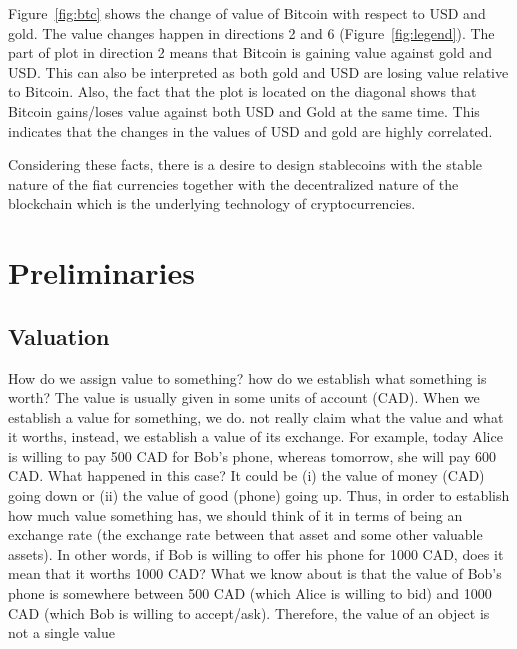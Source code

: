 Figure~\ref{fig:btc} shows the change of value of Bitcoin with respect to USD and gold. The value changes happen in directions 2 and 6 (Figure~\ref{fig:legend}). The part of plot in direction 2 means that Bitcoin is gaining value against gold and USD. This can also be interpreted as both gold and USD are losing value relative to Bitcoin. %
Also, the fact that the plot is located on the diagonal shows that Bitcoin gains/loses value against both USD and Gold at the same time. This indicates that the changes in the values of USD and gold are highly correlated.

Considering these facts, there is a desire to design stablecoins with the stable nature of the fiat currencies together with the decentralized nature of the blockchain which is the underlying technology of cryptocurrencies.


\section{Preliminaries}

\subsection{Valuation}

How do we assign value to something? how do we establish what something is worth?
The value is usually given in some units of account (\eg CAD). When we establish a value for something, we do. not really claim what the value and what it worths, instead, we establish a value of its exchange. For example, today Alice is willing to pay 500 CAD for Bob's phone, whereas tomorrow, she will pay 600 CAD. What happened in this case? It could be (i) the value of money (CAD) going down or (ii) the value of good (phone) going up. Thus, in order to establish how much value something has, we should think of it in terms of being an exchange rate (the exchange rate between that asset and some other valuable assets). In other words, if Bob is willing to offer his phone for 1000 CAD, does it mean that it worths 1000 CAD? What we know about is that the value of Bob's phone is somewhere between 500 CAD (which Alice is willing to bid) and 1000 CAD (which Bob is willing to accept/ask). Therefore, the value of an object is not a single value

